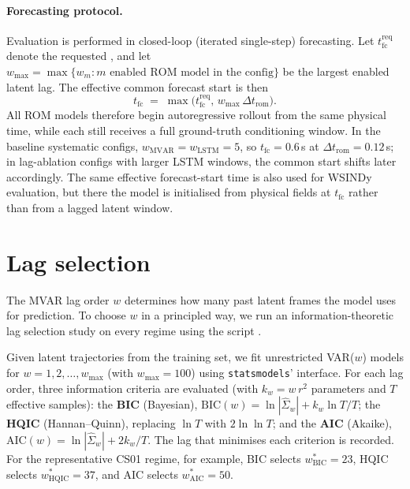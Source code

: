 \documentclass{report}
\theoremstyle{plain}
\theoremstyle{remark}
\numberwithin{equation}{section}              %
\begin{document}
\paragraph{Forecasting protocol.}
Evaluation is performed in closed-loop (iterated single-step) forecasting.
Let $t_{\mathrm{fc}}^{\mathrm{req}}$ denote the requested
, and let
$w_{\max}=\max\{w_m:\text{$m$ enabled ROM model in the config}\}$ be the
largest enabled latent lag.  The effective common forecast start is then
\begin{equation}
  t_{\mathrm{fc}}
  \;=\;
  \max\!\bigl(t_{\mathrm{fc}}^{\mathrm{req}},\, w_{\max}\,\Delta t_{\mathrm{rom}}\bigr).
\end{equation}
All ROM models therefore begin autoregressive rollout from the same
physical time, while each still receives a full ground-truth conditioning
window.  In the baseline systematic configs,
$w_{\mathrm{MVAR}}=w_{\mathrm{LSTM}}=5$, so
$t_{\mathrm{fc}}=0.6$\,s at $\Delta t_{\mathrm{rom}}=0.12$\,s; in
lag-ablation configs with larger LSTM windows, the common start shifts
later accordingly.  The same effective forecast-start time is also used
for WSINDy evaluation, but there the model is initialised from physical
fields at $t_{\mathrm{fc}}$ rather than from a lagged latent window.

%
\section{Lag selection}
\label{sec:lag_selection}

The MVAR lag order $w$ determines how many past latent frames the model
uses for prediction.  To choose $w$ in a principled way, we run an
information-theoretic lag selection study on every regime using the script
.

Given latent trajectories from the training set, we fit unrestricted
VAR($w$) models for $w=1,2,\dots,w_{\max}$ (with $w_{\max}=100$) using
\texttt{statsmodels}'  interface.  For each lag
order, three information criteria are evaluated (with $k_w = w\,r^2$ parameters and $T$ effective samples): the \textbf{BIC} (Bayesian), $\mathrm{BIC}(w) = \ln|\hat\Sigma_w| + k_w \ln T / T$; the \textbf{HQIC} (Hannan--Quinn), replacing $\ln T$ with $2\ln\ln T$; and the \textbf{AIC} (Akaike), $\mathrm{AIC}(w) = \ln|\hat\Sigma_w| + 2k_w/T$.
The lag that minimises each criterion is recorded.  For the representative
CS01 regime, for example, BIC selects $w^*_{\mathrm{BIC}}=23$,
HQIC selects $w^*_{\mathrm{HQIC}}=37$, and AIC selects
$w^*_{\mathrm{AIC}}=50$.
\end{document}
